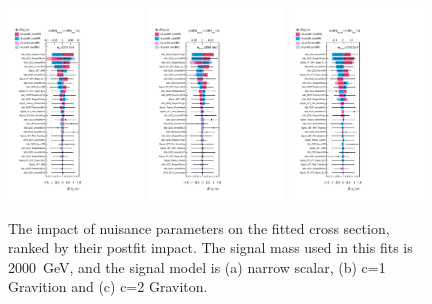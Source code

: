 \begin{figure}[htbp!]
\begin{center}
\includegraphics[width=0.32\textwidth,angle=-90]{figures/boosted/results/ranking_okt18_s_2000.pdf} 
\includegraphics[width=0.32\textwidth,angle=-90]{figures/boosted/results/ranking_okt18_g10_2000.pdf} 
\includegraphics[width=0.32\textwidth,angle=-90]{figures/boosted/results/ranking_okt18_g20_2000.pdf} 
\caption{The impact of nuisance parameters on the fitted cross section, ranked by their postfit impact. The signal mass used in this fits is 2000~GeV, and the signal model is (a) narrow scalar, (b) c=1 Gravition and (c) c=2 Graviton.}
\label{fig:ranking2000}
\end{center}
\end{figure}
